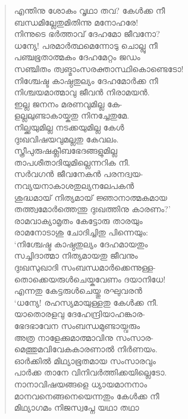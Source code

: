 \begin{verse}
എന്തിനു ശോകം വൃഥാ തവ? കേള്‍ക്ക നീ\\
ബന്ധമില്ലേതുമിതിന്നു മനോഹരേ!\\
നിന്നുടെ ഭര്‍ത്താവ് ദേഹമോ ജീവനോ?\\
ധന്യേ! പരമാര്‍ത്ഥമെന്നോടു ചൊല്ലു നീ\\
പഞ്ചഭൂതാത്മകം ദേഹമേറ്റം ജഡം\\
സഞ്ചിതം ത്വങ്മാംസരക്താസ്ഥികൊണ്ടെടോ!\\
നിശ്ചേഷ്ട കാഷ്ഠതുല്യം ദേഹമോര്‍ക്ക നീ\\
നിശ്ചയമാത്മാവു ജീവന്‍ നിരാമയന്‍.\\
ഇല്ല ജനനം മരണവുമില്ല കേ-\\
ളല്ലലുണ്ടാകായ്കതു നിനച്ചേതുമേ.\\
നില്ക്കയുമില്ല നടക്കയുമില്ല കേള്‍\\
ദുഃഖവിഷയവുമല്ലതു കേവലം.\\
സ്ത്രീപുരുഷക്ലീബഭേദങ്ങളുമില്ല\\
താപശീതാദിയുമില്ലെന്നറിക നീ.\\
സര്‍വഗന്‍ ജീവനേകന്‍ പരനദ്വയ-\\
നവ്യയനാകാശതുല്യനലേപകന്‍\\
ശുദ്ധമായ് നിത്യമായ് ജ്ഞാനാത്മകമായ\\
തത്ത്വമോര്‍ത്തെന്തു ദുഃഖത്തിനു കാരണം?’\\
രാമവാക്യാമൃതം കേട്ടോരു താരയും\\
രാമനോടാശു ചോദിച്ചിതു പിന്നെയും:\\
‘നിശ്ചേഷ്ട കാഷ്ഠതുല്യം ദേഹമായതും\\
സച്ചിദാത്മാ നിത്യമായതു ജീവനും\\
ദുഃഖസുഖാദി സംബന്ധമാര്‍ക്കെന്നുള്ള-\\
തൊക്കെയരുള്‍ചെയ്കവേണം ദയാനിധേ!\\
എന്നതു കേട്ടരുള്‍ചെയ്തു രഘുവരന്‍\\
‘ധന്യേ! രഹസ്യമായുള്ളതു കേള്‍ക്ക നീ.\\
യാതൊരളവു ദേഹേന്ദ്രിയാഹങ്കാര-\\
ഭേദഭാവേന സംബന്ധമുണ്ടായ്വരും\\
അത്ര നാളേക്കുമാത്മാവിനു സംസാര-\\
മെത്തുമവിവേകകാരണാല്‍ നിര്‍ണയം.\\
ഓര്‍ക്കില്‍ മിഥ്യാഭൂതമായ സംസാരവും\\
പാര്‍ക്ക താനേ വിനിവര്‍ത്തിക്കയില്ലെടോ.\\
നാനാവിഷയങ്ങളെ ധ്യായമാനനാം\\
മാനവനെങ്ങനെയെന്നതും കേള്‍ക്ക നീ\\
മിഥ്യാഗമം നിജസ്വപ്നേ യഥാ തഥാ\\

\end{verse}
